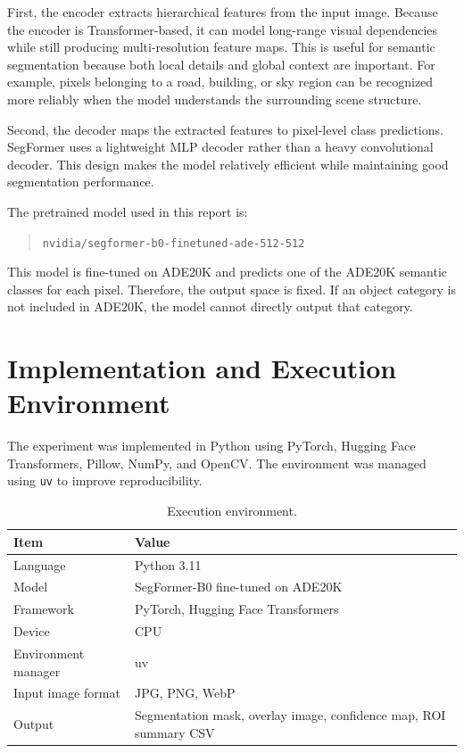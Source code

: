 \documentclass[10pt,a4paper]{article}
\begin{document}
First, the encoder extracts hierarchical features from the input image.
Because the encoder is Transformer-based, it can model long-range visual dependencies while still producing multi-resolution feature maps.
This is useful for semantic segmentation because both local details and global context are important.
For example, pixels belonging to a road, building, or sky region can be recognized more reliably when the model understands the surrounding scene structure.

Second, the decoder maps the extracted features to pixel-level class predictions.
SegFormer uses a lightweight MLP decoder rather than a heavy convolutional decoder.
This design makes the model relatively efficient while maintaining good segmentation performance.

The pretrained model used in this report is:

\begin{quote}
\texttt{nvidia/segformer-b0-finetuned-ade-512-512}
\end{quote}

This model is fine-tuned on ADE20K and predicts one of the ADE20K semantic classes for each pixel.
Therefore, the output space is fixed.
If an object category is not included in ADE20K, the model cannot directly output that category.

\section{Implementation and Execution Environment}

The experiment was implemented in Python using PyTorch, Hugging Face Transformers, Pillow, NumPy, and OpenCV.
The environment was managed using \texttt{uv} to improve reproducibility.

\begin{table}[H]
\centering
\caption{Execution environment.}
\begin{tabular}{ll}
\toprule
Item & Value \\
\midrule
Language & Python 3.11 \\
Model & SegFormer-B0 fine-tuned on ADE20K \\
Framework & PyTorch, Hugging Face Transformers \\
Device & CPU \\
Environment manager & uv \\
Input image format & JPG, PNG, WebP \\
Output & Segmentation mask, overlay image, confidence map, ROI summary CSV \\
\bottomrule
\end{tabular}
\end{table}
\end{document}
